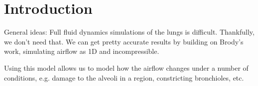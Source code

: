 \section{Introduction}

General ideas:
Full fluid dynamics simulations of the lungs is difficult. Thankfully, we don't need that. We can
get pretty accurate results by building on Brody's work, simulating airflow as 1D and
incompressible.

Using this model allows us to model how the airflow changes under a number of conditions, e.g.
damage to the alveoli in a region, constricting bronchioles, etc.
